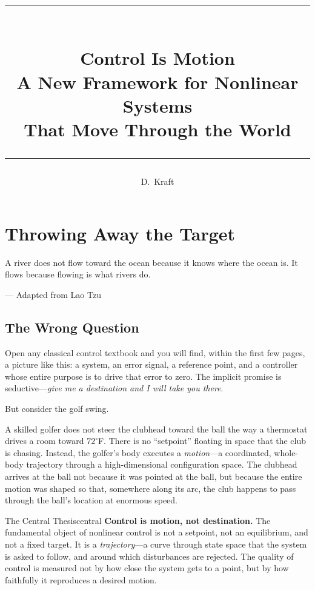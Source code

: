 \documentclass[12pt, openany]{book}
\title{%
  \vspace{-1cm}
  {\color{chapblue}\rule{\textwidth}{2pt}}\\[0.8cm]
  {\Huge\bfseries\color{chapblue} Control Is Motion}\\[0.4cm]
  {\Large A New Framework for Nonlinear Systems\\
  That Move Through the World}\\[0.6cm]
  {\color{chapblue}\rule{\textwidth}{2pt}}
}
\author{{\Large D.\ Kraft}}
\date{}
\theoremstyle{plain}
\begin{document}
\maketitle
\thispagestyle{empty}

\setcounter{chapter}{0}
\chapter{Throwing Away the Target}

\epigraph{%
  A river does not flow toward the ocean because it knows where the ocean is.
  It flows because flowing is what rivers do.
}{--- \textup{Adapted from Lao Tzu}}

\vspace{0.5cm}

\section{The Wrong Question}

Open any classical control textbook and you will find, within the first few pages, a
picture like this: a system, an error signal, a reference point, and a controller
whose entire purpose is to drive that error to zero. The implicit promise is
seductive---\emph{give me a destination and I will take you there}.

But consider the golf swing.

A skilled golfer does not steer the clubhead toward the ball the way a thermostat
drives a room toward $72^\circ$F. There is no ``setpoint'' floating in space that
the club is chasing. Instead, the golfer's body executes a \emph{motion}---a
coordinated, whole-body trajectory through a high-dimensional configuration space.
The clubhead arrives at the ball not because it was pointed at the ball, but because
the entire motion was shaped so that, somewhere along its arc, the club happens to
pass through the ball's location at enormous speed.

\begin{keyidea}{The Central Thesis}{central}
  \textbf{Control is motion, not destination.}
  The fundamental object of nonlinear control is not a setpoint, not an equilibrium,
  and not a fixed target. It is a \emph{trajectory}---a curve through state space
  that the system is asked to follow, and around which disturbances are rejected.
  The quality of control is measured not by how close the system gets to a point,
  but by how faithfully it reproduces a desired motion.
\end{keyidea}
\end{document}
